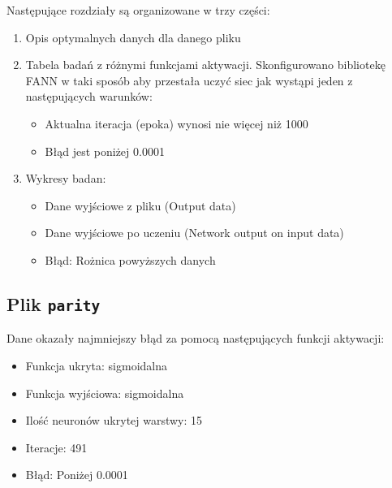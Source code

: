 \documentclass[pointlessnumbers, abstracton, headsepline, a4paper]{scrartcl}
\begin{document}
Następujące rozdziały są organizowane w trzy części:
\begin{enumerate}
\item Opis optymalnych danych dla danego pliku
\item Tabela badań z różnymi funkcjami aktywacji. Skonfigurowano bibliotekę FANN w taki sposób aby przestała uczyć siec jak wystąpi jeden z następujących warunków:
\begin{itemize}
\item Aktualna iteracja (epoka) wynosi nie więcej niż 1000
\item Błąd jest poniżej 0.0001
\end{itemize}
\item Wykresy badan:
\begin{itemize}
\item Dane wyjściowe z pliku (Output data)
\item Dane wyjściowe po uczeniu (Network output on input data)
\item Błąd: Rożnica powyższych danych
\end{itemize}
\end{enumerate}

\clearpage
\subsection{Plik \texttt{parity}}

Dane okazały najmniejszy błąd za pomocą następujących funkcji aktywacji:
\begin{itemize}
\item Funkcja ukryta: sigmoidalna
\item Funkcja wyjściowa: sigmoidalna
\item Ilość neuronów ukrytej warstwy: 15
\item Iteracje: 491
\item Błąd: Poniżej 0.0001
\end{itemize}
\end{document}

